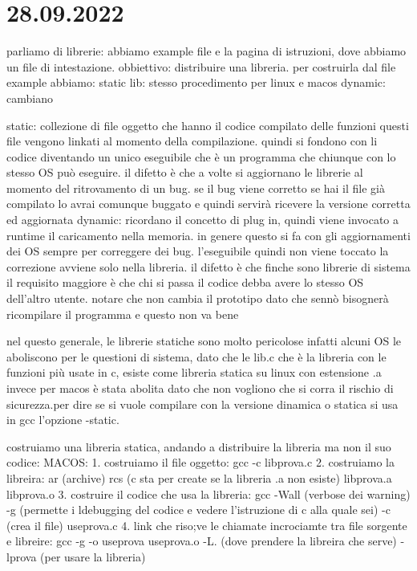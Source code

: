 \section{28.09.2022}

parliamo di librerie: abbiamo example file e la pagina di istruzioni, dove abbiamo un file di intestazione. obbiettivo: distribuire una libreria. per costruirla dal file example abbiamo:
static lib: stesso procedimento per linux e macos
dynamic: cambiano

static: collezione di file oggetto che hanno il codice compilato delle funzioni questi file vengono linkati al momento della compilazione. quindi si fondono con li codice diventando un unico eseguibile che è un programma che chiunque con lo stesso OS può eseguire. il difetto è che a volte si aggiornano le librerie al momento del ritrovamento di un bug. se il bug viene corretto se hai il file già compilato lo avrai comunque buggato e quindi servirà ricevere la versione corretta ed aggiornata
dynamic: ricordano il concetto di plug in, quindi viene invocato a runtime il caricamento nella memoria. in genere questo si fa con gli aggiornamenti dei OS sempre per correggere dei bug. l'eseguibile quindi non viene toccato la correzione avviene solo nella libreria. il difetto è che finche sono librerie di sistema il requisito maggiore è che chi si passa il codice debba avere lo stesso OS dell'altro utente. notare che non cambia il prototipo dato che sennò bisognerà ricompilare il programma e questo non va bene

nel questo generale, le librerie statiche sono molto pericolose infatti alcuni OS le aboliscono per le questioni di sistema, dato che le lib.c che è la libreria con le funzioni più usate in c, esiste come libreria statica su linux con estensione .a invece per macos è stata abolita dato che non vogliono che si corra il rischio di sicurezza.per dire se si vuole compilare con la versione dinamica o statica si usa in gcc l'opzione -static. 

costruiamo una libreria statica, andando a distribuire la libreria ma non il suo codice:
MACOS:
1. costruiamo il file oggetto: gcc -c libprova.c
2. costruiamo la libreira: ar (archive) rcs (c sta per create se la libreria .a non esiste) libprova.a libprova.o
3. costruire il codice che usa la libreria: gcc -Wall (verbose dei warning) -g (permette i ldebugging del codice e vedere l'istruzione di c alla quale sei) -c (crea il file) useprova.c
4. link che riso;ve le chiamate incrociamte tra file sorgente e libreire: gcc -g -o useprova useprova.o -L. (dove prendere la libreira che serve) -lprova (per usare la libreria)



